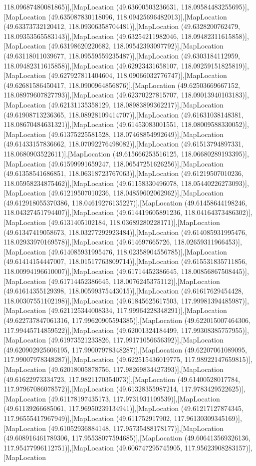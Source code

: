 118.09687480081865)],[MapLocation (49.63600503236631, 118.09584483255695)],[MapLocation (49.635087830118096, 118.09425696482013)],[MapLocation (49.63373732120412, 118.09306358704481)],[MapLocation (49.6328200762479, 118.09353565583143)],[MapLocation (49.63254211982046, 118.09482311615858)],[MapLocation (49.63198620220682, 118.09542393097792)],[MapLocation (49.63118011039677, 118.09559559235487)],[MapLocation (49.6303184112959, 118.09482311615858)],[MapLocation (49.62923431658107, 118.09259151825819)],[MapLocation (49.627927811404604, 118.09066032776747)],[MapLocation (49.62681586450417, 118.0900964856876)],[MapLocation (49.62503669667152, 118.08979607827793)],[MapLocation (49.62370227815707, 118.09013940103183)],[MapLocation (49.62131135358129, 118.08983899362217)],[MapLocation (49.61908713236365, 118.08928109414707)],[MapLocation (49.61631038148381, 118.08670484631321)],[MapLocation (49.61453083001551, 118.08009588330052)],[MapLocation (49.61375225581528, 118.07468854992649)],[MapLocation (49.61433157836662, 118.07092276498082)],[MapLocation (49.61513794897331, 118.0680903522611)],[MapLocation (49.615666253516125, 118.06680289193395)],[MapLocation (49.61599991659247, 118.06547251626256)],[MapLocation (49.61358541686851, 118.06318723767063)],[MapLocation (49.61219507010236, 118.05958234875462)],[MapLocation (49.61158330496078, 118.05440226273093)],[MapLocation (49.61219507010236, 118.04859602062962)],[MapLocation (49.612918055370386, 118.04619276135227)],[MapLocation (49.61458644198246, 118.04327451794407)],[MapLocation (49.614419605891236, 118.04164373486302)],[MapLocation (49.6131405102184, 118.03689280228171)],[MapLocation (49.61347419058673, 118.03277292923484)],[MapLocation (49.614085931995476, 118.02933970169578)],[MapLocation (49.614697665726, 118.02659311966453)],[MapLocation (49.614085931995476, 118.02358904556785)],[MapLocation (49.61414154447007, 118.01517763809714)],[MapLocation (49.615531835711856, 118.00994196610007)],[MapLocation (49.61714452386645, 118.00856867508445)],[MapLocation (49.61714452386645, 118.0076245375112)],[MapLocation (49.61614355129398, 118.00599375443015)],[MapLocation (49.61617629454428, 118.00307551102198)],[MapLocation (49.61845625617503, 117.99981394485987)],[MapLocation (49.621125344008334, 117.99964228348291)],[MapLocation (49.622737847061316, 117.99620905594385)],[MapLocation (49.622015007464306, 117.99445714859522)],[MapLocation (49.62001324184499, 117.99308385757955)],[MapLocation (49.61973521233826, 117.99171056656392)],[MapLocation (49.620902925606195, 117.99007978348287)],[MapLocation (49.62207061089095, 117.99007978348287)],[MapLocation (49.622515436019775, 117.98922147659815)],[MapLocation (49.62018005878756, 117.98269834427393)],[MapLocation (49.61622973334723, 117.9821170354073)],[MapLocation (49.61400528017784, 117.97967086078572)],[MapLocation (49.61328355987214, 117.9783429522625)],[MapLocation (49.61178197435173, 117.9731931109539)],[MapLocation (49.61139266685061, 117.96950239134941)],[MapLocation (49.61217127874345, 117.96555417967949)],[MapLocation (49.611752917902, 117.96130309345169)],[MapLocation (49.61052936884148, 117.95735488178177)],[MapLocation (49.608916461789306, 117.95538077594685)],[MapLocation (49.606413569326136, 117.95477996112751)],[MapLocation (49.606747295745905, 117.95623908283157)],[MapLocation 